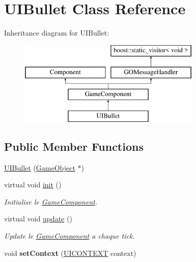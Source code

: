 \hypertarget{class_u_i_bullet}{}\section{U\+I\+Bullet Class Reference}
\label{class_u_i_bullet}
Inheritance diagram for U\+I\+Bullet\+:\begin{figure}[H]
\begin{center}
\leavevmode
\includegraphics[height=4.000000cm]{class_u_i_bullet}
\end{center}
\end{figure}
\subsection*{Public Member Functions}
\begin{DoxyCompactItemize}
\item 
\hyperlink{class_u_i_bullet_a5036f0f1649cbb182b46a37ba4096bc1}{U\+I\+Bullet} (\hyperlink{class_game_object}{Game\+Object} $\ast$)
\item 
\hypertarget{class_u_i_bullet_a46d657568a2458cbf6206265e17f966b}{}\label{class_u_i_bullet_a46d657568a2458cbf6206265e17f966b} 
virtual void \hyperlink{class_u_i_bullet_a46d657568a2458cbf6206265e17f966b}{init} ()
\begin{DoxyCompactList}\small\item\em Initialise le \hyperlink{class_game_component}{Game\+Component}. \end{DoxyCompactList}\item 
\hypertarget{class_u_i_bullet_ad88e53627d06397907b9537c809626ed}{}\label{class_u_i_bullet_ad88e53627d06397907b9537c809626ed} 
virtual void \hyperlink{class_u_i_bullet_ad88e53627d06397907b9537c809626ed}{update} ()
\begin{DoxyCompactList}\small\item\em Update le \hyperlink{class_game_component}{Game\+Component} a chaque tick. \end{DoxyCompactList}\item 
\hypertarget{class_u_i_bullet_a92bc30d8dc5a23773e0a12ff92d400ae}{}\label{class_u_i_bullet_a92bc30d8dc5a23773e0a12ff92d400ae} 
void {\bfseries set\+Context} (\hyperlink{struct_u_i_c_o_n_t_e_x_t}{U\+I\+C\+O\+N\+T\+E\+XT} context)
\end{DoxyCompactItemize}
